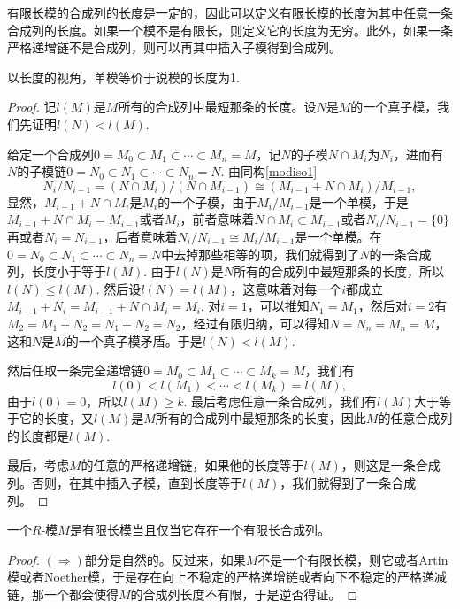 \begin{pro}
有限长模的合成列的长度是一定的，因此可以定义有限长模的长度为其中任意一条合成列的长度。如果一个模不是有限长，则定义它的长度为无穷。此外，如果一条严格递增链不是合成列，则可以再其中插入子模得到合成列。
\end{pro}

以长度的视角，单模等价于说模的长度为1.

\begin{proof}
	记$l(M)$是$M$所有的合成列中最短那条的长度。设$N$是$M$的一个真子模，我们先证明$l(N)<l(M)$.

	给定一个合成列$0=M_0\subset M_1\subset \cdots\subset M_n=M$，记$N$的子模$N\cap M_i$为$N_i$，进而有$N$的子模链$0=N_0\subset N_1\subset \cdots\subset N_n=N$. 由同构\eqref{modiso1}
	\[
	N_i/N_{i-1}=(N\cap M_i)/(N\cap M_{i-1})\cong (M_{i-1}+N\cap M_i)/M_{i-1},
	\]
	显然，$M_{i-1}+N\cap M_i$是$M_i$的一个子模，由于$M_i/M_{i-1}$是一个单模，于是$M_{i-1}+N\cap M_i=M_{i-1}$或者$M_i$，前者意味着$N\cap M_i\subset M_{i-1}$或者$N_i/N_{i-1}=\{0\}$再或者$N_i=N_{i-1}$，后者意味着$N_i/N_{i-1}\cong M_i/M_{i-1}$是一个单模。在$0=N_0\subset N_1\subset \cdots\subset N_n=N$中去掉那些相等的项，我们就得到了$N$的一条合成列，长度小于等于$l(M)$. 由于$l(N)$是$N$所有的合成列中最短那条的长度，所以$l(N)\leq l(M)$. 然后设$l(N)=l(M)$，这意味着对每一个$i$都成立$M_{i-1}+N_i=M_{i-1}+N\cap M_i=M_i$. 对$i=1$，可以推知$N_1=M_1$，然后对$i=2$有$M_2=M_1+N_2=N_1+N_2=N_2$，经过有限归纳，可以得知$N=N_n=M_n=M$，这和$N$是$M$的一个真子模矛盾。于是$l(N)<l(M)$.

	然后任取一条完全递增链$0=M_0\subset M_1\subset \cdots\subset M_k=M$，我们有
	\[
	l(0)<l(M_1)<\cdots<l(M_k)=l(M),
	\]
	由于$l(0)=0$，所以$l(M)\geq k$. 最后考虑任意一条合成列，我们有$l(M)$大于等于它的长度，又$l(M)$是$M$所有的合成列中最短那条的长度，因此$M$的任意合成列的长度都是$l(M)$.

	最后，考虑$M$的任意的严格递增链，如果他的长度等于$l(M)$，则这是一条合成列。否则，在其中插入子模，直到长度等于$l(M)$，我们就得到了一条合成列。
\end{proof}

\begin{pro}
一个$R$-模$M$是有限长模当且仅当它存在一个有限长合成列。
\end{pro}

\begin{proof}
	$(\Rightarrow)$部分是自然的。反过来，如果$M$不是一个有限长模，则它或者Artin模或者Noether模，于是存在向上不稳定的严格递增链或者向下不稳定的严格递减链，那一个都会使得$M$的合成列长度不有限，于是逆否得证。
\end{proof}

